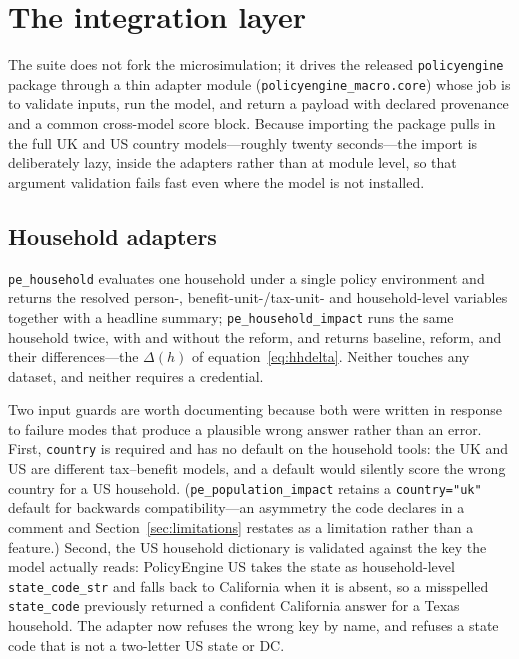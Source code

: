 \section{The integration layer}
\label{sec:method}

The suite does not fork the microsimulation; it drives the released \texttt{policyengine} package through a thin adapter module (\texttt{policyengine\_macro.core}) whose job is to validate inputs, run the model, and return a payload with declared provenance and a common cross-model score block. Because importing the package pulls in the full UK and US country models---roughly twenty seconds---the import is deliberately lazy, inside the adapters rather than at module level, so that argument validation fails fast even where the model is not installed.

\subsection{Household adapters}

\texttt{pe\_household} evaluates one household under a single policy environment and returns the resolved person-, benefit-unit-/tax-unit- and household-level variables together with a headline summary; \texttt{pe\_household\_impact} runs the same household twice, with and without the reform, and returns baseline, reform, and their differences---the $\Delta(h)$ of equation~\eqref{eq:hhdelta}. Neither touches any dataset, and neither requires a credential.

Two input guards are worth documenting because both were written in response to failure modes that produce a plausible wrong answer rather than an error. First, \texttt{country} is required and has no default on the household tools: the UK and US are different tax--benefit models, and a default would silently score the wrong country for a US household. (\texttt{pe\_population\_impact} retains a \texttt{country="uk"} default for backwards compatibility---an asymmetry the code declares in a comment and Section~\ref{sec:limitations} restates as a limitation rather than a feature.) Second, the US household dictionary is validated against the key the model actually reads: PolicyEngine US takes the state as household-level \texttt{state\_code\_str} and falls back to California when it is absent, so a misspelled \texttt{state\_code} previously returned a confident California answer for a Texas household. The adapter now refuses the wrong key by name, and refuses a state code that is not a two-letter US state or DC.


